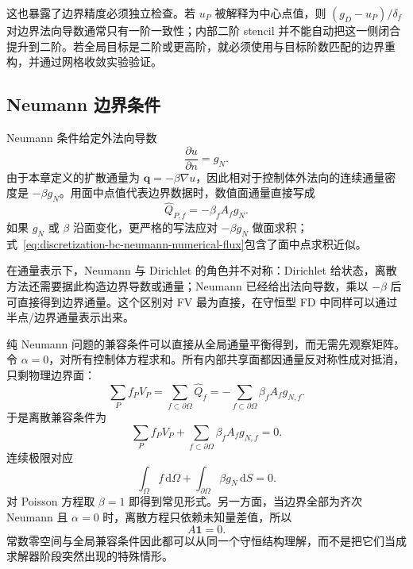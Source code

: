 这也暴露了边界精度必须独立检查。若 $u_P$ 被解释为中心点值，则 $(g_D-u_P)/\delta_f$ 对边界法向导数通常只有一阶一致性；内部二阶 stencil 并不能自动把这一侧闭合提升到二阶。若全局目标是二阶或更高阶，就必须使用与目标阶数匹配的边界重构，并通过网格收敛实验验证。

\subsection{Neumann 边界条件}

Neumann 条件给定外法向导数
\begin{equation}
\frac{\partial u}{\partial n}=g_N.
\label{eq:discretization-neumann-bc}
\end{equation}
由于本章定义的扩散通量为 $\bm q=-\beta\nabla u$，因此相对于控制体外法向的连续通量密度是 $-\beta g_N$。用面中点值代表边界数据时，数值面通量直接写成
\begin{equation}
\boxed{
\widehat Q_{P,f}
=-\beta_fA_fg_N.
}
\label{eq:discretization-bc-neumann-numerical-flux}
\end{equation}
如果 $g_N$ 或 $\beta$ 沿面变化，更严格的写法应对 $-\beta g_N$ 做面求积；式~\eqref{eq:discretization-bc-neumann-numerical-flux}包含了面中点求积近似。

在通量表示下，Neumann 与 Dirichlet 的角色并不对称：Dirichlet 给状态，离散方法还需要据此构造边界导数或通量；Neumann 已经给出法向导数，乘以 $-\beta$ 后可直接得到边界通量。这个区别对 FV 最为直接，在守恒型 FD 中同样可以通过半点/边界通量表示出来。

纯 Neumann 问题的兼容条件可以直接从全局通量平衡得到，而无需先观察矩阵。令 $\alpha=0$，对所有控制体方程求和。所有内部共享面都因通量反对称性成对抵消，只剩物理边界面：
\begin{equation}
\sum_P f_PV_P
=
\sum_{f\subset\partial\Omega}\widehat Q_f
=-\sum_{f\subset\partial\Omega}\beta_fA_fg_{N,f}.
\end{equation}
于是离散兼容条件为
\begin{equation}
\boxed{
\sum_P f_PV_P
+\sum_{f\subset\partial\Omega}\beta_fA_fg_{N,f}=0.
}
\label{eq:discretization-neumann-discrete-compatibility}
\end{equation}
连续极限对应
\begin{equation}
\boxed{
\int_\Omega f\,\mathrm d\Omega
+\int_{\partial\Omega}\beta g_N\,\mathrm dS=0.
}
\label{eq:discretization-neumann-compatibility}
\end{equation}
对 Poisson 方程取 $\beta=1$ 即得到常见形式。另一方面，当边界全部为齐次 Neumann 且 $\alpha=0$ 时，离散方程只依赖未知量差值，所以
\begin{equation}
A\bm 1=0.
\end{equation}
常数零空间与全局兼容条件因此都可以从同一个守恒结构理解，而不是把它们当成求解器阶段突然出现的特殊情形。

